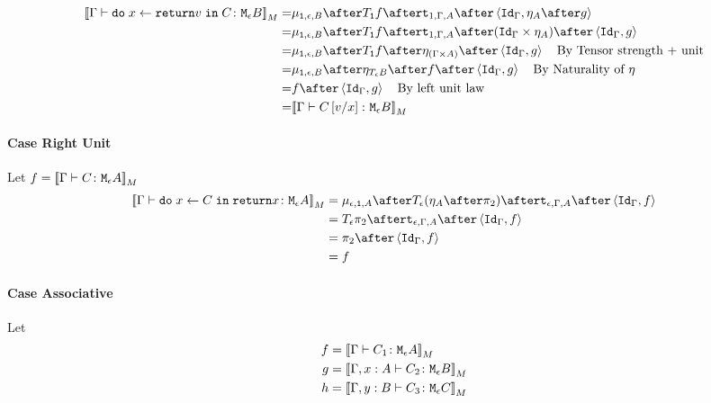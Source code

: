 {    \begin{equation}
        \begin{split}
            \deno{\gtyperelation{\doin{x}{\return{v}}{C}}{\meb}} = &  \bind{\1}{\e}{B} \after \T{\1}{f} \after \tstrength{1}{\G}{A} \after \pr{\idg}{\point{A}\after g} \\
            = & \bind{\1}{\e}{B} \after \T{\1}{f} \after \tstrength{1}{\G}{A} \after (\idg\times \point{A}) \after \pr{\idg}{g} \\
            = & \bind{\1}{\e}{B} \after \T{\1}{f} \after \point{(\G \times A)} \after \pr{\idg}{g} \qt{By Tensor strength + unit}\\
            = & \bind{\1}{\e}{B}\after\point{\teb}\after f\after\pr{\idg}{g} \qt{By Naturality of $\point{}$}\\
            = & f\after\pr{\idg}{g} \qt{By left unit law}\\
            = & \deno{\gtyperelation{C\ssub{x}{v}}{\meb}}\\
        \end{split}
    \end{equation}


    

    \paragraph{Case Right Unit}
    
    Let $f = {\bf [\![}\Gamma \vdash C \colon \texttt{M}_{\epsilon}{A}{\bf ]\!]}_M$ 
        \begin{equation}
        \begin{split}
            \deno{\gtyperelation{\doin{x}{C}{\return{x}}}{\mea}}  & = \bind{\e}{\1}{A} \after \T{\e}{(\point{A} \after \pp)} \after \tstrength{\e}{\G}{A}\after \pr{\idg}{f} \\
            & = \T{\e}{\pp} \after \tstrength{\e}{\G}{A} \after \pr {\idg}{f} \\
            & = \pp \after \pr{\idg}{f}\\
            & = f
        \end{split}
    \end{equation}
    
    

    \paragraph{Case Associative}
    Let
    \begin{align}
        f ={}& {\bf [\![}\Gamma \vdash C_1 \colon \texttt{M}_{\epsilon}{A}{\bf ]\!]}_M\\
        g ={}& {\bf [\![}\Gamma, x: A \vdash C_2 \colon \texttt{M}_{\epsilon}{B}{\bf ]\!]}_M\\
        h ={}& {\bf [\![}\Gamma, y: B \vdash C_3 \colon \texttt{M}_{\epsilon}{C}{\bf ]\!]}_M
    \end{align}

}
